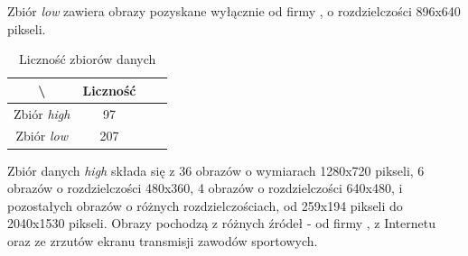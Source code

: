 Zbiór \textit{low} zawiera obrazy pozyskane wyłącznie od firmy \blue{}, o rozdzielczości 896x640 pikseli.

\begin{table}[!h]
	\centering
	\caption{Liczność zbiorów danych}
	\vspace{6pt}
	{\footnotesize
		\begin{tabular}{|c|c|c|c|}
			\hline \textbackslash & Liczność \\
      \hline Zbiór \textit{high} & 97 \\
      \hline Zbiór \textit{low} & 207 \\
      \hline
		\end{tabular}
	}
	\vspace{0pt}
\end{table}

Zbiór danych \textit{high} składa się z 36 obrazów o wymiarach 1280x720 pikseli, 6 obrazów o rozdzielczości 480x360, 4 obrazów o rozdzielczości 640x480, i pozostałych obrazów o różnych rozdzielczościach, od 259x194 pikseli do 2040x1530 pikseli. Obrazy pochodzą z różnych źródeł - od firmy \blue{}, z Internetu oraz ze zrzutów ekranu transmisji zawodów sportowych.
